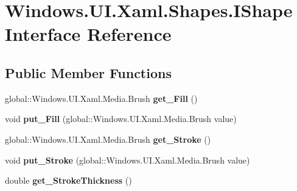 \hypertarget{interface_windows_1_1_u_i_1_1_xaml_1_1_shapes_1_1_i_shape}{}\section{Windows.\+U\+I.\+Xaml.\+Shapes.\+I\+Shape Interface Reference}
\label{interface_windows_1_1_u_i_1_1_xaml_1_1_shapes_1_1_i_shape}
\subsection*{Public Member Functions}
\begin{DoxyCompactItemize}
\item 
\mbox{\label{interface_windows_1_1_u_i_1_1_xaml_1_1_shapes_1_1_i_shape_af4e42d9485e6d268e44504c627789501}} 
global\+::\+Windows.\+U\+I.\+Xaml.\+Media.\+Brush {\bfseries get\+\_\+\+Fill} ()
\item 
\mbox{\label{interface_windows_1_1_u_i_1_1_xaml_1_1_shapes_1_1_i_shape_a95f26341489f0a5b4fb33bc70d6a42ee}} 
void {\bfseries put\+\_\+\+Fill} (global\+::\+Windows.\+U\+I.\+Xaml.\+Media.\+Brush value)
\item 
\mbox{\label{interface_windows_1_1_u_i_1_1_xaml_1_1_shapes_1_1_i_shape_a750991e7e91011576e9bf0089176dab9}} 
global\+::\+Windows.\+U\+I.\+Xaml.\+Media.\+Brush {\bfseries get\+\_\+\+Stroke} ()
\item 
\mbox{\label{interface_windows_1_1_u_i_1_1_xaml_1_1_shapes_1_1_i_shape_ad644072c65741324450d8ae05a6c187b}} 
void {\bfseries put\+\_\+\+Stroke} (global\+::\+Windows.\+U\+I.\+Xaml.\+Media.\+Brush value)
\item 
\mbox{\label{interface_windows_1_1_u_i_1_1_xaml_1_1_shapes_1_1_i_shape_a6d613bc0441546b161b5e37a3ad670bb}} 
double {\bfseries get\+\_\+\+Stroke\+Thickness} ()
\item 
\mbox{\label{interface_windows_1_1_u_i_1_1_xaml_1_1_shapes_1_1_i_shape_af9a5cdb73397a297f29adca4e3eb36fd}} 

\end{DoxyCompactItemize}
